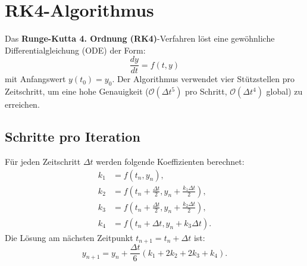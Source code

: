 \section{RK4-Algorithmus}
Das \textbf{Runge-Kutta 4. Ordnung (RK4)}-Verfahren löst eine gewöhnliche Differentialgleichung (ODE) der Form:
\[
\frac{dy}{dt} = f(t, y)
\]
mit Anfangswert \( y(t_0) = y_0 \). Der Algorithmus verwendet vier Stützstellen pro Zeitschritt, um eine hohe Genauigkeit (\(\mathcal{O}(\Delta t^5)\) pro Schritt, \(\mathcal{O}(\Delta t^4)\) global) zu erreichen.

\subsection*{Schritte pro Iteration}
Für jeden Zeitschritt \(\Delta t\) werden folgende Koeffizienten berechnet:
\[
\begin{aligned}
k_1 &= f(t_n, y_n), \\
k_2 &= f\left(t_n + \frac{\Delta t}{2}, y_n + \frac{k_1 \Delta t}{2}\right), \\
k_3 &= f\left(t_n + \frac{\Delta t}{2}, y_n + \frac{k_2 \Delta t}{2}\right), \\
k_4 &= f(t_n + \Delta t, y_n + k_3 \Delta t).
\end{aligned}
\]
Die Lösung am nächsten Zeitpunkt \( t_{n+1} = t_n + \Delta t \) ist:
\[
y_{n+1} = y_n + \frac{\Delta t}{6} (k_1 + 2k_2 + 2k_3 + k_4).
\]

